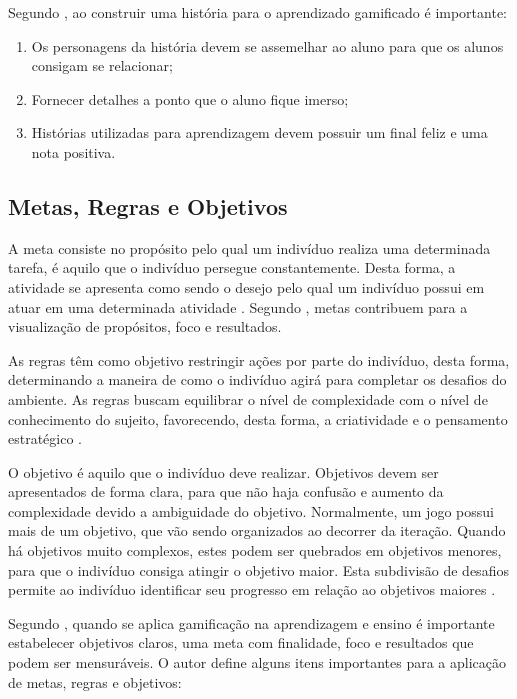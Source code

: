 \documentclass[
	12pt,				%
	oneside,			%
	a4paper,			%
	english,			%
	french,				%
	spanish,			%
	brazil,				%
	]{abntex2}
\begin{document}
Segundo \citet{andre2018}, ao construir uma história para o aprendizado gamificado é importante:
\begin{enumerate}
\item Os personagens da história devem se assemelhar ao aluno para que os alunos consigam se relacionar;
\item Fornecer detalhes a ponto que o aluno fique imerso;
\item Histórias utilizadas para aprendizagem devem possuir um final feliz e uma nota positiva.
\end{enumerate}

\subsection{Metas, Regras e Objetivos}

A meta consiste no propósito pelo qual um indivíduo realiza uma determinada tarefa, é aquilo que o indivíduo persegue constantemente. Desta forma, a atividade se apresenta como sendo o desejo pelo qual um indivíduo possui em atuar em uma determinada atividade \cite{bunchball2016gamification}. Segundo \citet{kaap:2014}, metas contribuem para a visualização de propósitos, foco e resultados.

As regras têm como objetivo restringir ações por parte do indivíduo, desta forma, determinando a maneira de como o indivíduo agirá para completar os desafios do ambiente. As regras buscam equilibrar o nível de complexidade com o nível de conhecimento do sujeito, favorecendo, desta forma, a criatividade e o pensamento estratégico \cite{bunchball2016gamification}.

O objetivo é aquilo que o indivíduo deve realizar. Objetivos devem ser apresentados de forma clara, para que não haja confusão e aumento da complexidade devido a ambiguidade do objetivo. Normalmente, um jogo possui mais de um objetivo, que vão sendo organizados ao decorrer da iteração. Quando há objetivos muito complexos, estes podem ser quebrados em objetivos menores, para que o indivíduo consiga atingir o objetivo maior. Esta subdivisão de desafios permite ao indivíduo identificar seu progresso em relação ao objetivos maiores \cite{fardo2013gamificaccao}.

Segundo \citet{andre2018}, quando se aplica gamificação na aprendizagem e ensino é importante estabelecer objetivos claros, uma meta com finalidade, foco e resultados que podem ser mensuráveis. O autor define alguns itens importantes para a aplicação de metas, regras e objetivos:
\end{document}
